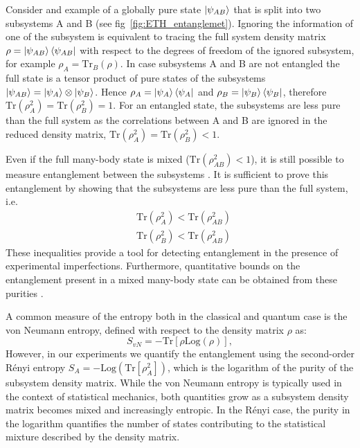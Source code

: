 Consider and example of a globally pure state $\left|\psi_{AB}\right\rangle$ that is split into two subsystems A and B (see fig~\ref{fig:ETH_entanglemet}). Ignoring the information of one of the subsystem is equivalent to tracing the full system density matrix $\rho = \left|\psi_{AB}\right\rangle\left\langle \psi_{AB}\right|$ with respect to the degrees of freedom of the ignored subsystem, for example $\rho_A =\textrm{Tr}_B(\rho)$. In case subsystems A and B are not entangled the full state is a tensor product of pure states of the subsystems $\left|\psi_{AB}\right\rangle=\left|\psi_{A}\right\rangle\otimes\left|\psi_{B}\right\rangle$. Hence $\rho_{A}= \left|\psi_{A}\right\rangle\left\langle \psi_{A}\right|$ and $\rho_B= \left|\psi_{B}\right\rangle\left\langle \psi_{B}\right|$, therefore $\textrm{Tr}(\rho_A^2)=\textrm{Tr}(\rho_B^2)=1$. For an entangled state, the subsystems are less pure than the full system as the correlations between A and B are ignored in the reduced density matrix, $\textrm{Tr}(\rho_A^2)=\textrm{Tr}(\rho_B^2)<1$.

Even if the full many-body state is mixed ($\textrm{Tr}(\rho_{AB}^2) < 1$), it is still possible to measure entanglement between the subsystems \cite{Horodecki2009}. It is sufficient \cite{Horodecki1996} to prove this entanglement by showing that the subsystems are less pure than the full system, i.e.
\begin{equation}
\begin{aligned}
&\textrm{Tr}(\rho_{A}^2)<\textrm{Tr}(\rho_{AB}^2)    \\
&\textrm{Tr}(\rho_{B}^2)<\textrm{Tr}(\rho_{AB}^2)
\end{aligned}
\end{equation}
These inequalities provide a tool for detecting entanglement in the presence of experimental imperfections. Furthermore, quantitative bounds on the entanglement present in a mixed many-body state can be obtained from these purities \cite{Mintert2007}.

A common measure of the entropy both in the classical and quantum case is the von Neumann entropy, defined with respect to the density matrix $\rho$ as:
\begin{equation}
S_{vN} = - \textrm{Tr}[\rho \textrm{Log}(\rho)],
\end{equation}
However, in our experiments we quantify the entanglement using the second-order R\'{e}nyi entropy $S_A = -\textrm{Log}(\textrm{Tr}[\rho_A^2])$, which is the logarithm of the purity of the subsystem density matrix. While the von Neumann entropy is typically used in the context of statistical mechanics, both quantities grow as a subsystem density matrix becomes mixed and increasingly entropic. In the R\'{e}nyi case, the purity in the logarithm quantifies the number of states contributing to the statistical mixture described by the density matrix. 

